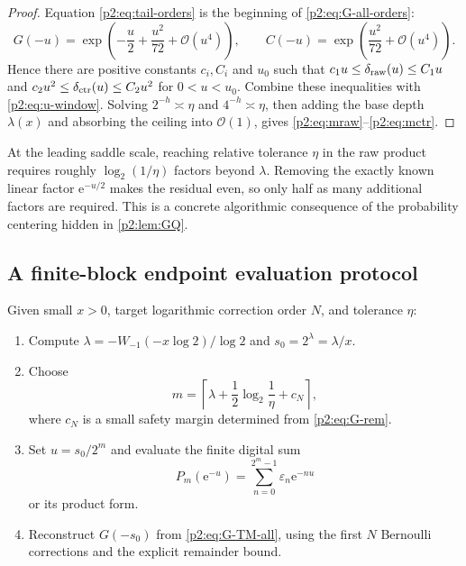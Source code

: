 \documentclass[11pt,oneside]{article}
\numberwithin{equation}{section}
\theoremstyle{definition}
\theoremstyle{remark}
\newcommand{\e}{\mathrm e}
\newcommand{\bigO}{\mathcal O}
\newcommand{\eps}{\varepsilon}
\begin{document}
\begin{proof}
Equation \eqref{p2:eq:tail-orders} is the beginning of \eqref{p2:eq:G-all-orders}:
\[
 G(-u)=\exp\!\left(-\frac u2+\frac{u^2}{72}+\bigO(u^4)\right),
 \qquad
 C(-u)=\exp\!\left(\frac{u^2}{72}+\bigO(u^4)\right).
\]
Hence there are positive constants $c_i,C_i$ and $u_0$ such that
$c_1u\le\delta_{\rm raw}(u)\le C_1u$ and
$c_2u^2\le\delta_{\rm ctr}(u)\le C_2u^2$ for $0<u<u_0$.
Combine these inequalities with \eqref{p2:eq:u-window}.  Solving $2^{-h}\asymp\eta$ and
$4^{-h}\asymp\eta$, then adding the base depth $\lambda(x)$ and absorbing the ceiling into
$\bigO(1)$, gives \eqref{p2:eq:mraw}--\eqref{p2:eq:mctr}.
\end{proof}

\begin{remark}
At the leading saddle scale, reaching relative tolerance $\eta$ in the raw product requires
roughly $\log_2(1/\eta)$ factors beyond $\lambda$.  Removing the exactly known linear factor
$\e^{-u/2}$ makes the residual even, so only half as many additional factors are required.
This is a concrete algorithmic consequence of the probability centering hidden in
\cref{p2:lem:GQ}.
\end{remark}

\subsection{A finite-block endpoint evaluation protocol}

\begin{algorithm}
\label{p2:alg:Lambert}
Given small $x>0$, target logarithmic correction order $N$, and tolerance $\eta$:
\begin{enumerate}
\item Compute $\lambda=-W_{-1}(-x\log2)/\log2$ and $s_0=2^\lambda=\lambda/x$.
\item Choose
\[
 m=\left\lceil\lambda+\frac12\log_2\frac1\eta+c_N\right\rceil,
\]
where $c_N$ is a small safety margin determined from \eqref{p2:eq:G-rem}.
\item Set $u=s_0/2^m$ and evaluate the finite digital sum
\[
 P_m(\e^{-u})=\sum_{n=0}^{2^m-1}\eps_n\e^{-nu}
\]
or its product form.
\item Reconstruct $G(-s_0)$ from \eqref{p2:eq:G-TM-all}, using the first $N$ Bernoulli
corrections and the explicit remainder bound.
\end{enumerate}
\end{algorithm}
\end{document}
